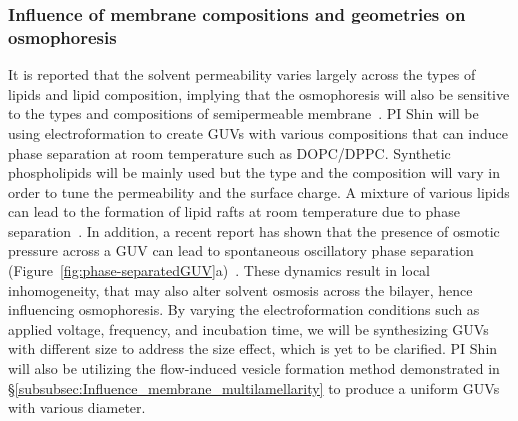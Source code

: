 \documentclass[11pt]{article}
\begin{document}
\subsubsection{Influence of membrane compositions and geometries on
osmophoresis}
\label{subsubsec:influence_membrane_compositions}

It is reported that the solvent permeability varies largely across the
types of lipids and lipid composition, implying that the osmophoresis
will also be sensitive to the types and compositions of semipermeable
membrane~\cite{fettiplace1980, olbrich2000}.  PI Shin will be using
electroformation to create GUVs with various compositions that can
induce phase separation at room temperature such as DOPC/DPPC.
Synthetic phospholipids will be mainly used but the type and the
composition will vary in order to tune the permeability and the surface
charge.  A mixture of various lipids can lead to the formation of lipid
rafts at room temperature due to phase separation~\cite{veatch2003}.  In
addition, a recent report has shown that the presence of osmotic
pressure across a GUV can lead to spontaneous oscillatory phase
separation (Figure~\ref{fig:phase-separatedGUV}a)~\cite{oglkecka2014}.
These dynamics result in local inhomogeneity, that may also alter
solvent osmosis across the bilayer, hence influencing osmophoresis.  By
varying the electroformation conditions such as applied voltage,
frequency, and incubation time, we will be synthesizing GUVs with
different size to address the size effect, which is yet to be clarified.
PI Shin will also be utilizing the flow-induced vesicle formation method
demonstrated in \S\ref{subsubsec:Influence_membrane_multilamellarity} to
produce a uniform GUVs with various diameter.


\end{document}
